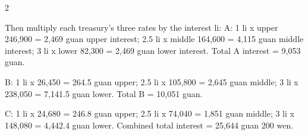 \documentclass[11pt,a4paper]{article}
\begin{document}
\begin{paracol}{2}
{Then multiply each treasury's three rates by the interest li: A: 1 li x upper 246,900 = 2,469 guan upper interest; 2.5 li x middle 164,600 = 4,115 guan middle interest; 3 li x lower 82,300 = 2,469 guan lower interest. Total A interest = 9,053 guan.

B: 1 li x 26,450 = 264.5 guan upper; 2.5 li x 105,800 = 2,645 guan middle; 3 li x 238,050 = 7,141.5 guan lower. Total B = 10,051 guan.

C: 1 li x 24,680 = 246.8 guan upper; 2.5 li x 74,040 = 1,851 guan middle; 3 li x 148,080 = 4,442.4 guan lower. Combined total interest = 25,644 guan 200 wen.}

\end{paracol}

\end{document}
